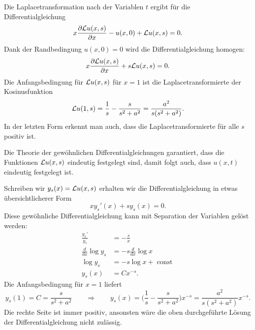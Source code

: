 \begin{loesung}
\begin{teilaufgaben}
\item
Die Laplacetransformation nach der Variablen $t$
ergibt für die Differentialgleichung
\[
x\frac{\partial{\cal L}u(x,s)}{\partial x}
-
u(x,0)+{\cal L}u(x,s)=0.
\]
Dank der Randbedingung $u(x,0)=0$ wird die Differentialgleichung
homogen:
\[
x\frac{\partial{\cal L}u(x,s)}{\partial x}
+
s{\cal L}u(x,s)=0.
\]
Die Anfangsbedingung für ${\cal L}u(x,s)$ für $x=1$ ist die
Laplacetransformierte der Kosinusfunktion
\[
{\cal L}u(1,s)=\frac1s-\frac{s}{s^2+a^2} = \frac{a^2}{s(s^2+a^2)}.
\]
In der letzten Form erkennt man auch, dass die Laplacetransformierte
für alle $s$ positiv ist.
\item
Die Theorie der gewöhnlichen Differentialgleichungen garantiert, dass
die Funktionen ${\cal L}u(x,s)$ eindeutig festgelegt sind, damit folgt
auch, dass $u(x,t)$ eindeutig festgelegt ist.
\item
Schreiben wir $y_s(x)={\cal L}u(x,s)$ erhalten wir die Differentialgleichung
in etwas übersichtlicherer Form
\begin{equation}
xy_s'(x)+sy_s(x)=0.
\label{50000008:sdgl}
\end{equation}
Diese gewöhnliche Differentialgleichung kann mit Separation der
Variablen gelöst werden:
\begin{align*}
\frac{y_s'}{y_s}&=-\frac{s}{x}
\\
\frac{d}{dx}\log y_s&=-s\frac{d}{dx}\log x
\\
\log y_s&=-s\log x+\operatorname{const}
\\
y_s(x)&=Cx^{-s}.
\end{align*}
Die Anfangsbedingung für $x=1$ liefert
\begin{equation}
y_s(1)=C=\frac{s}{s^2+a^2}
\qquad\Rightarrow\qquad
y_s(x)
=
\biggl(\frac1s-\frac{s}{s^2+a^2}\biggr)x^{-s}
=
\frac{a^2}{s(s^2+a^2)}x^{-s}.
\label{50000008:loesung}
\end{equation}
Die rechte Seite ist immer positiv, ansonsten wäre die oben durchgeführte
Lösung der Differentialgleichung nicht zulässig.
\qedhere
\end{teilaufgaben}
\end{loesung}

